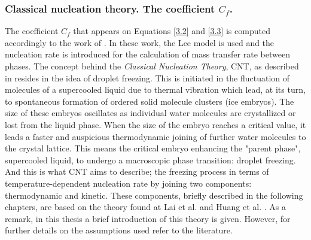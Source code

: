\subsubsection{Classical nucleation theory. The coefficient $C_f$.}
The coefficient $C_f$ that appears on Equations \ref{3.2} and \ref{3.3} is computed accordingly to the work of \cite{huang_wang_li_2020}. In these work, the Lee model is used and the nucleation rate is introduced for the calculation of mass transfer rate between phases. 
\newline
The concept behind the \textit{Classical Nucleation Theory}, CNT, as described in \cite{ickes_welti_hoose_lohmann_2015} resides in the idea of droplet freezing. This is initiated in the fluctuation of molecules of a supercooled liquid due to thermal vibration which lead, at its turn, to spontaneous formation of ordered solid molecule clusters (ice embryos). The size of these embryos oscillates as individual water molecules are crystallized or lost from the liquid phase. When the size of the embryo reaches a critical value, it leads a faster and auspicious thermodynamic joining of further water molecules to the crystal lattice. This means the critical embryo enhancing the "parent phase", supercooled liquid, to undergo a macroscopic phase transition: droplet freezing.
\newline
And this is what CNT aims to describe; the freezing process in terms of temperature-dependent nucleation rate by joining two components: thermodynamic and kinetic. These components, briefly described in the following chapters, are based on the theory found at Lai et al. \cite{wu_lai_zhang_2015} and Huang et al. \cite{huang_wang_li_2020}.
\newline
As a remark, in this thesis a brief introduction of this theory is given. However, for further details on the assumptions used refer to the literature.

